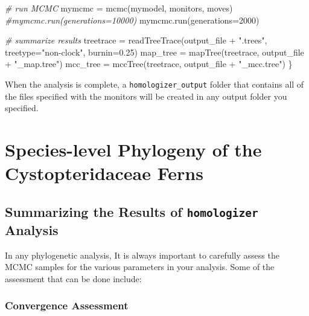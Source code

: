 \documentclass[
]{book}
\newenvironment{Shaded}{\begin{snugshade}}{\end{snugshade}}
\newcommand{\AttributeTok}[1]{\textcolor[rgb]{0.77,0.63,0.00}{#1}}
\newcommand{\CommentTok}[1]{\textcolor[rgb]{0.56,0.35,0.01}{\textit{#1}}}
\newcommand{\DecValTok}[1]{\textcolor[rgb]{0.00,0.00,0.81}{#1}}
\newcommand{\FloatTok}[1]{\textcolor[rgb]{0.00,0.00,0.81}{#1}}
\newcommand{\FunctionTok}[1]{\textcolor[rgb]{0.00,0.00,0.00}{#1}}
\newcommand{\NormalTok}[1]{#1}
\newcommand{\OtherTok}[1]{\textcolor[rgb]{0.56,0.35,0.01}{#1}}
\newcommand{\SpecialCharTok}[1]{\textcolor[rgb]{0.00,0.00,0.00}{#1}}
\newcommand{\StringTok}[1]{\textcolor[rgb]{0.31,0.60,0.02}{#1}}
\begin{document}
\begin{Shaded}
\begin{Highlighting}[]
    \CommentTok{\# run MCMC }
\NormalTok{    mymcmc }\OtherTok{=} \FunctionTok{mcmc}\NormalTok{(mymodel, monitors, moves)}
    \CommentTok{\#mymcmc.run(generations=10000)}
    \FunctionTok{mymcmc.run}\NormalTok{(}\AttributeTok{generations=}\DecValTok{2000}\NormalTok{)}

    \CommentTok{\# summarize results}
\NormalTok{    treetrace }\OtherTok{=} \FunctionTok{readTreeTrace}\NormalTok{(output\_file }\SpecialCharTok{+} \StringTok{".trees"}\NormalTok{, }\AttributeTok{treetype=}\StringTok{"non{-}clock"}\NormalTok{, }\AttributeTok{burnin=}\FloatTok{0.25}\NormalTok{) }
\NormalTok{    map\_tree }\OtherTok{=} \FunctionTok{mapTree}\NormalTok{(treetrace, output\_file }\SpecialCharTok{+} \StringTok{"\_map.tree"}\NormalTok{)}
\NormalTok{    mcc\_tree }\OtherTok{=} \FunctionTok{mccTree}\NormalTok{(treetrace, output\_file }\SpecialCharTok{+} \StringTok{"\_mcc.tree"}\NormalTok{)}
\NormalTok{\}}
\end{Highlighting}
\end{Shaded}

When the analysis is complete, a \texttt{homologizer\_output} folder that contains all of the files specified with the monitors will be created in any output folder you specified.

\hypertarget{phylogeny-design}{%
\chapter{Species-level Phylogeny of the Cystopteridaceae Ferns}\label{phylogeny-design}}

\hypertarget{summarizing-the-results-of-homologizer-analysis}{%
\section{\texorpdfstring{Summarizing the Results of \texttt{homologizer} Analysis}{Summarizing the Results of homologizer Analysis}}\label{summarizing-the-results-of-homologizer-analysis}}

In any phylogenetic analysis, It is always important to carefully assess the MCMC samples for the various parameters in your analysis. Some of the assessment that can be done include:

\hypertarget{convergence-assessment}{%
\subsection{Convergence Assessment}\label{convergence-assessment}}
\end{document}
